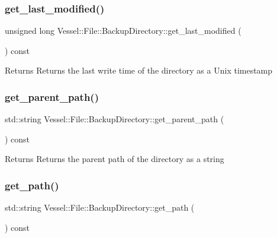\subsubsection{\texorpdfstring{get\+\_\+last\+\_\+modified()}{get\_last\_modified()}}
{\footnotesize\ttfamily unsigned long Vessel\+::\+File\+::\+Backup\+Directory\+::get\+\_\+last\+\_\+modified (\begin{DoxyParamCaption}{ }\end{DoxyParamCaption}) const}

\begin{DoxyReturn}{Returns}
Returns the last write time of the directory as a Unix timestamp 
\end{DoxyReturn}
\mbox{\label{class_vessel_1_1_file_1_1_backup_directory_aeb7e8ef5e3860f27c3af785eeacaf747}} 
\subsubsection{\texorpdfstring{get\+\_\+parent\+\_\+path()}{get\_parent\_path()}}
{\footnotesize\ttfamily std\+::string Vessel\+::\+File\+::\+Backup\+Directory\+::get\+\_\+parent\+\_\+path (\begin{DoxyParamCaption}{ }\end{DoxyParamCaption}) const}

\begin{DoxyReturn}{Returns}
Returns the parent path of the directory as a string 
\end{DoxyReturn}
\mbox{\label{class_vessel_1_1_file_1_1_backup_directory_a47ff6b7be593c424b5e2f68a5abb3987}} 
\subsubsection{\texorpdfstring{get\+\_\+path()}{get\_path()}}
{\footnotesize\ttfamily std\+::string Vessel\+::\+File\+::\+Backup\+Directory\+::get\+\_\+path (\begin{DoxyParamCaption}{ }\end{DoxyParamCaption}) const}


